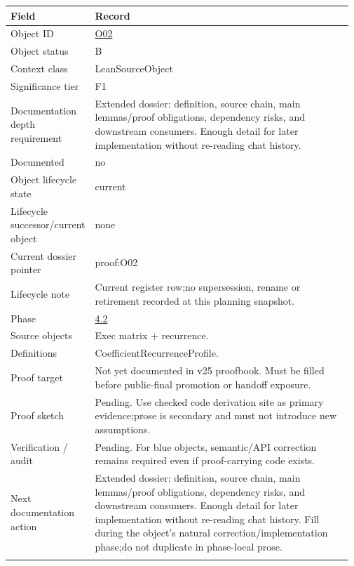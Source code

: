 \begin{longtable}{L{0.16\linewidth} L{0.81\linewidth}}
\hline
\textbf{Field} & \textbf{Record}\\
\hline
Object ID & \hyperlink{object-row-O02}{O02}\\
\hline\addlinespace[0.20em]
Object status & B\\
\hline\addlinespace[0.20em]
Context class & LeanSourceObject\\
\hline\addlinespace[0.20em]
Significance tier & F1\\
\hline\addlinespace[0.20em]
Documentation depth requirement & Extended dossier: definition, source chain, main lemmas/\allowbreak{}proof obligations, dependency risks, and downstream consumers. Enough detail for later implementation without re-reading chat history.\\
\hline\addlinespace[0.20em]
Documented & no\\
\hline\addlinespace[0.20em]
Object lifecycle state & current\\
\hline\addlinespace[0.20em]
Lifecycle successor/\allowbreak{}current object & none\\
\hline\addlinespace[0.20em]
Current dossier pointer & proof:O02\\
\hline\addlinespace[0.20em]
Lifecycle note & Current register row;\newline no supersession, rename or retirement recorded at this planning snapshot.\\
\hline\addlinespace[0.20em]
Phase & \hyperlink{phase-row-4-2}{4.2}\\
\hline\addlinespace[0.20em]
Source objects & Exec matrix + recurrence.\\
\hline\addlinespace[0.20em]
Definitions & CoefficientRecurrenceProfile.\\
\hline\addlinespace[0.20em]
Proof target & Not yet documented in v25 proofbook. Must be filled before public-final promotion or handoff exposure.\\
\hline\addlinespace[0.20em]
Proof sketch & Pending. Use checked code derivation site as primary evidence;\newline prose is secondary and must not introduce new assumptions.\\
\hline\addlinespace[0.20em]
Verification /\allowbreak{} audit & Pending. For blue objects, semantic/\allowbreak{}API correction remains required even if proof-carrying code exists.\\
\hline\addlinespace[0.20em]
Next documentation action & Extended dossier: definition, source chain, main lemmas/\allowbreak{}proof obligations, dependency risks, and downstream consumers. Enough detail for later implementation without re-reading chat history. Fill during the object's natural correction/\allowbreak{}implementation phase;\newline do not duplicate in phase-local prose.\\
\hline\addlinespace[0.20em]
\end{longtable}
